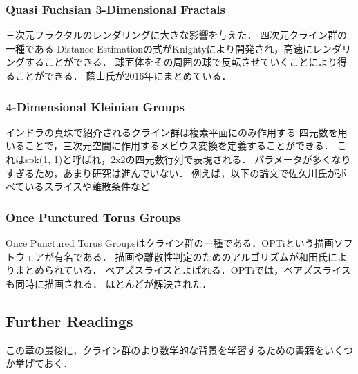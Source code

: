 \subsubsection{Quasi Fuchsian 3-Dimensional Fractals}
三次元フラクタルのレンダリングに大きな影響を与えた．
四次元クライン群の一種である
Distance Estimationの式がKnightyにより開発され，高速にレンダリングすることができる．
球面体をその周囲の球で反転させていくことにより得ることができる．
蔭山氏が2016年にまとめている．

\subsubsection{4-Dimensional Kleinian Groups}
インドラの真珠で紹介されるクライン群は複素平面にのみ作用する
四元数を用いることで，三次元空間に作用するメビウス変換を定義することができる．
これはspk(1, 1)と呼ばれ，2x2の四元数行列で表現される．
パラメータが多くなりすぎるため，あまり研究は進んでいない．
例えば，以下の論文で佐久川氏が述べているスライスや離散条件など

\subsubsection{Once Punctured Torus Groups}
Once Punctured Torus Groupsはクライン群の一種である．OPTiという描画ソフトウェアが有名である．
描画や離散性判定のためのアルゴリズムが和田氏によりまとめられている．
ベアズスライスとよばれる．OPTiでは，ベアズスライスも同時に描画される．
ほとんどが解決された．

\subsection{Further Readings}
この章の最後に，クライン群のより数学的な背景を学習するための書籍をいくつか挙げておく．
